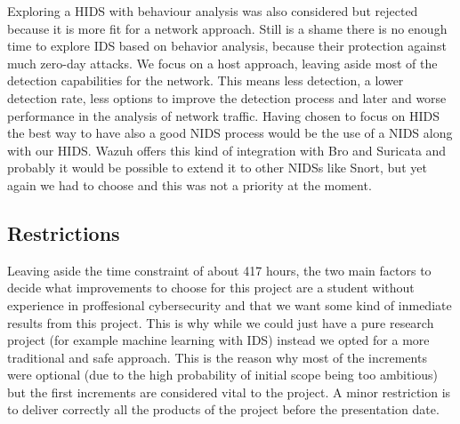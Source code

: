 \linej
\linej
Exploring a HIDS with behaviour analysis was also considered but rejected because it is more fit for a network approach. Still is a shame there is no enough time to explore IDS based on behavior analysis, because their protection against much zero-day attacks.
\linej
\linej
We focus on a host approach, leaving aside most of the detection capabilities for the network. This means less detection, a lower detection rate, less options to improve the detection process and later and worse performance in the analysis of network traffic. Having chosen to focus on HIDS the best way to have also a good NIDS process would be the use of a NIDS along with our HIDS.
\linej
Wazuh offers this kind of integration with Bro and Suricata and probably it would be possible to extend it to other NIDSs like Snort, but yet again we had to choose and this was not a priority at the moment.



\subsection{Restrictions}
Leaving aside the time constraint of about 417 hours, the two main factors to decide what improvements to choose for this project are a student without experience in proffesional cybersecurity and that we want some kind of inmediate results from this project. This is why while we could just have a pure research project (for example machine learning with IDS) instead we opted for a more traditional and safe approach. This is the reason why most of the increments were optional (due to the high probability of initial scope being too ambitious) but the first increments are considered vital to the project.
\linej
\linej
A minor restriction is to deliver correctly all the products of the project before the presentation date.

